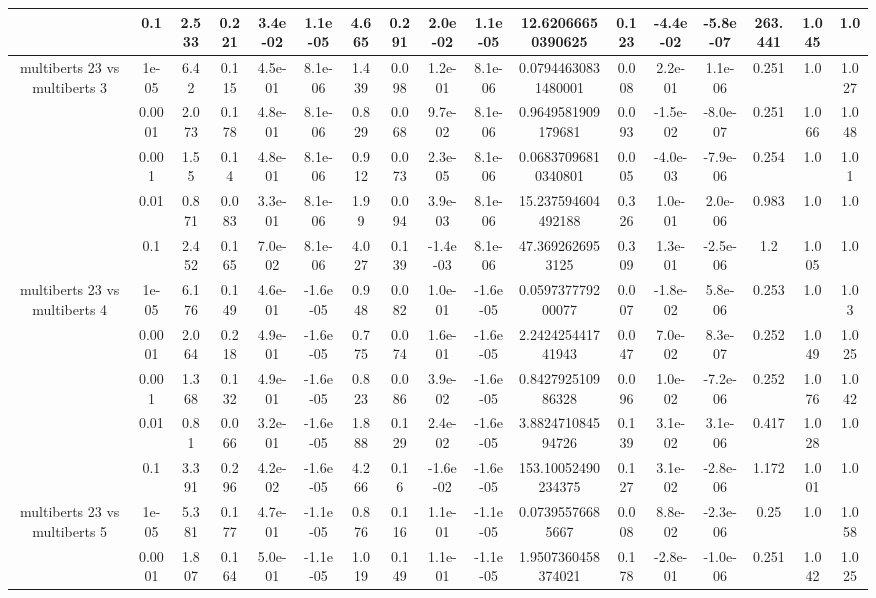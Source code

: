 \begin{tabular}{|c|c|c|c|c|c|c|c|c|c|c|c|c|c|c|c|c|}
 & 0.1 & 2.533 & 0.221 & 3.4e-02 & 1.1e-05 & 4.665 & 0.291 & 2.0e-02 & 1.1e-05 & 12.62066650390625 & 0.123 & -4.4e-02 & -5.8e-07 & 263.441 & 1.045 & 1.0 \\
\hline
\multirow{5}{*}{multiberts 23 vs multiberts 3} & 1e-05 & 6.42 & 0.115 & 4.5e-01 & 8.1e-06 & 1.439 & 0.098 & 1.2e-01 & 8.1e-06 & 0.07944630831480001 & 0.008 & 2.2e-01 & 1.1e-06 & 0.251 & 1.0 & 1.027 \\
 & 0.0001 & 2.073 & 0.178 & 4.8e-01 & 8.1e-06 & 0.829 & 0.068 & 9.7e-02 & 8.1e-06 & 0.9649581909179681 & 0.093 & -1.5e-02 & -8.0e-07 & 0.251 & 1.066 & 1.048 \\
 & 0.001 & 1.55 & 0.14 & 4.8e-01 & 8.1e-06 & 0.912 & 0.073 & 2.3e-05 & 8.1e-06 & 0.06837096810340801 & 0.005 & -4.0e-03 & -7.9e-06 & 0.254 & 1.0 & 1.01 \\
 & 0.01 & 0.871 & 0.083 & 3.3e-01 & 8.1e-06 & 1.99 & 0.094 & 3.9e-03 & 8.1e-06 & 15.237594604492188 & 0.326 & 1.0e-01 & 2.0e-06 & 0.983 & 1.0 & 1.0 \\
 & 0.1 & 2.452 & 0.165 & 7.0e-02 & 8.1e-06 & 4.027 & 0.139 & -1.4e-03 & 8.1e-06 & 47.3692626953125 & 0.309 & 1.3e-01 & -2.5e-06 & 1.2 & 1.005 & 1.0 \\
\hline
\multirow{5}{*}{multiberts 23 vs multiberts 4} & 1e-05 & 6.176 & 0.149 & 4.6e-01 & -1.6e-05 & 0.948 & 0.082 & 1.0e-01 & -1.6e-05 & 0.059737779200077 & 0.007 & -1.8e-02 & 5.8e-06 & 0.253 & 1.0 & 1.03 \\
 & 0.0001 & 2.064 & 0.218 & 4.9e-01 & -1.6e-05 & 0.775 & 0.074 & 1.6e-01 & -1.6e-05 & 2.242425441741943 & 0.047 & 7.0e-02 & 8.3e-07 & 0.252 & 1.049 & 1.025 \\
 & 0.001 & 1.368 & 0.132 & 4.9e-01 & -1.6e-05 & 0.823 & 0.086 & 3.9e-02 & -1.6e-05 & 0.842792510986328 & 0.096 & 1.0e-02 & -7.2e-06 & 0.252 & 1.076 & 1.042 \\
 & 0.01 & 0.81 & 0.066 & 3.2e-01 & -1.6e-05 & 1.888 & 0.129 & 2.4e-02 & -1.6e-05 & 3.882471084594726 & 0.139 & 3.1e-02 & 3.1e-06 & 0.417 & 1.028 & 1.0 \\
 & 0.1 & 3.391 & 0.296 & 4.2e-02 & -1.6e-05 & 4.266 & 0.16 & -1.6e-02 & -1.6e-05 & 153.10052490234375 & 0.127 & 3.1e-02 & -2.8e-06 & 1.172 & 1.001 & 1.0 \\
\hline
\multirow{5}{*}{multiberts 23 vs multiberts 5} & 1e-05 & 5.381 & 0.177 & 4.7e-01 & -1.1e-05 & 0.876 & 0.116 & 1.1e-01 & -1.1e-05 & 0.07395576685667 & 0.008 & 8.8e-02 & -2.3e-06 & 0.25 & 1.0 & 1.058 \\
 & 0.0001 & 1.807 & 0.164 & 5.0e-01 & -1.1e-05 & 1.019 & 0.149 & 1.1e-01 & -1.1e-05 & 1.9507360458374021 & 0.178 & -2.8e-01 & -1.0e-06 & 0.251 & 1.042 & 1.025 \\

\end{tabular}

